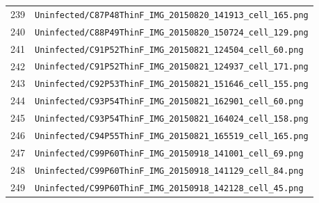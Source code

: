 \begin{longtable}{r p{12cm}}
239 & \texttt{Uninfected/C87P48ThinF\_IMG\_20150820\_141913\_cell\_165.png} \\
240 & \texttt{Uninfected/C88P49ThinF\_IMG\_20150820\_150724\_cell\_129.png} \\
241 & \texttt{Uninfected/C91P52ThinF\_IMG\_20150821\_124504\_cell\_60.png} \\
242 & \texttt{Uninfected/C91P52ThinF\_IMG\_20150821\_124937\_cell\_171.png} \\
243 & \texttt{Uninfected/C92P53ThinF\_IMG\_20150821\_151646\_cell\_155.png} \\
244 & \texttt{Uninfected/C93P54ThinF\_IMG\_20150821\_162901\_cell\_60.png} \\
245 & \texttt{Uninfected/C93P54ThinF\_IMG\_20150821\_164024\_cell\_158.png} \\
246 & \texttt{Uninfected/C94P55ThinF\_IMG\_20150821\_165519\_cell\_165.png} \\
247 & \texttt{Uninfected/C99P60ThinF\_IMG\_20150918\_141001\_cell\_69.png} \\
248 & \texttt{Uninfected/C99P60ThinF\_IMG\_20150918\_141129\_cell\_84.png} \\
249 & \texttt{Uninfected/C99P60ThinF\_IMG\_20150918\_142128\_cell\_45.png} \\
\hline
\end{longtable}
